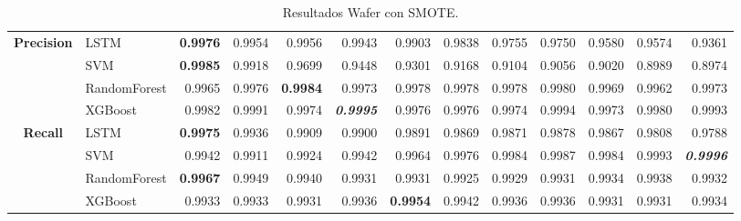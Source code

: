 \begin{table}[H]
\begin{adjustbox}{max width=14cm}
\begin{tabular}{|c|l|r|r|r|r|r|r|r|r|r|r|r|}
			\hline
			\textbf{Precision} &  LSTM & \textbf{  0.9976 } &  0.9954 &  0.9956 &  0.9943 &  0.9903 &  0.9838 &  0.9755 &  0.9750 &  0.9580 &  0.9574 &  0.9361 \\
			&  SVM & \textbf{  0.9985 } &  0.9918 &  0.9699 &  0.9448 &  0.9301 &  0.9168 &  0.9104 &  0.9056 &  0.9020 &  0.8989 &  0.8974 \\
			&  RandomForest &  0.9965 &  0.9976 & \textbf{  0.9984 } &  0.9973 &  0.9978 &  0.9978 &  0.9978 &  0.9980 &  0.9969 &  0.9962 &  0.9973 \\
			&  XGBoost &  0.9982 &  0.9991 &  0.9974 & \textit{ \textbf{  0.9995 } } &  0.9976 &  0.9976 &  0.9974 &  0.9994 &  0.9973 &  0.9980 &  0.9993 \\
			\hline
			\textbf{Recall} &  LSTM & \textbf{  0.9975 } &  0.9936 &  0.9909 &  0.9900 &  0.9891 &  0.9869 &  0.9871 &  0.9878 &  0.9867 &  0.9808 &  0.9788 \\
			&  SVM &  0.9942 &  0.9911 &  0.9924 &  0.9942 &  0.9964 &  0.9976 &  0.9984 &  0.9987 &  0.9984 &  0.9993 & \textit{ \textbf{  0.9996 } } \\
			&  RandomForest & \textbf{  0.9967 } &  0.9949 &  0.9940 &  0.9931 &  0.9931 &  0.9925 &  0.9929 &  0.9931 &  0.9934 &  0.9938 &  0.9932 \\
			&  XGBoost &  0.9933 &  0.9933 &  0.9931 &  0.9936 & \textbf{  0.9954 } &  0.9942 &  0.9936 &  0.9936 &  0.9931 &  0.9931 &  0.9934 \\
			\hline
		\end{tabular}
	\end{adjustbox}
	\caption{Resultados Wafer con SMOTE.}
	\label{tab:Wafer_SMOTE}
\end{table}

